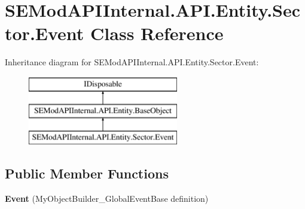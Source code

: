 \hypertarget{class_s_e_mod_a_p_i_internal_1_1_a_p_i_1_1_entity_1_1_sector_1_1_event}{}\section{S\+E\+Mod\+A\+P\+I\+Internal.\+A\+P\+I.\+Entity.\+Sector.\+Event Class Reference}
\label{class_s_e_mod_a_p_i_internal_1_1_a_p_i_1_1_entity_1_1_sector_1_1_event}
Inheritance diagram for S\+E\+Mod\+A\+P\+I\+Internal.\+A\+P\+I.\+Entity.\+Sector.\+Event\+:\begin{figure}[H]
\begin{center}
\leavevmode
\includegraphics[height=3.000000cm]{class_s_e_mod_a_p_i_internal_1_1_a_p_i_1_1_entity_1_1_sector_1_1_event}
\end{center}
\end{figure}
\subsection*{Public Member Functions}
\begin{DoxyCompactItemize}
\item 
\hypertarget{class_s_e_mod_a_p_i_internal_1_1_a_p_i_1_1_entity_1_1_sector_1_1_event_a11ccf6615da70aa4075a4ee84ec2fd84}{}{\bfseries Event} (My\+Object\+Builder\+\_\+\+Global\+Event\+Base definition)\label{class_s_e_mod_a_p_i_internal_1_1_a_p_i_1_1_entity_1_1_sector_1_1_event_a11ccf6615da70aa4075a4ee84ec2fd84}

\end{DoxyCompactItemize}
